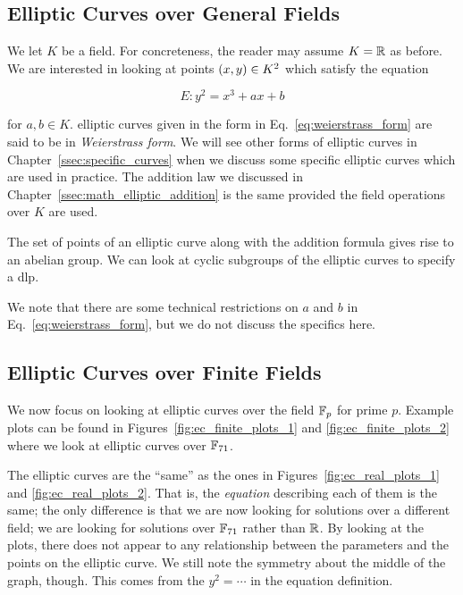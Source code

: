 \subsection{Elliptic Curves over General Fields}

We let $K$ be a \gls{field}.
For concreteness, the reader may assume $K = \mathbb{R}$ as before.
We are interested in looking at points $\left( x,y \right)\in K^{2}$
which satisfy the equation

\begin{equation}
    E: y^{2} = x^{3} + ax + b
    \label{eq:weierstrass_form}
\end{equation}

\noindent
for $a,b\in K$.
\Glspl{elliptic curve} given in the form in Eq.~\eqref{eq:weierstrass_form}
are said to be in \emph{Weierstrass form}.
We will see other forms of \glspl{elliptic curve}
in Chapter~\ref{ssec:specific_curves}
when we discuss some specific \glspl{elliptic curve} which are used in practice.
The addition law we discussed in
Chapter~\ref{ssec:math_elliptic_addition}
is the same provided the field operations over $K$ are used.

The set of points of an \gls{elliptic curve} along with the addition
formula gives rise to an \gls{abelian group}.
We can look at cyclic subgroups of the \glspl{elliptic curve} to specify
a \gls{dlp}.

We note that there are some technical restrictions on $a$ and $b$
in Eq.~\eqref{eq:weierstrass_form},
but we do not discuss the specifics here.


\subsection{Elliptic Curves over Finite Fields}

We now focus on looking at \glspl{elliptic curve} over the
\gls{field} $\mathbb{F}_{p}$ for prime $p$.
Example plots can be found in Figures~\ref{fig:ec_finite_plots_1}
and \ref{fig:ec_finite_plots_2}
where we look at \glspl{elliptic curve} over $\mathbb{F}_{71}$.



The \glspl{elliptic curve} are the ``same'' as the ones in
Figures~\ref{fig:ec_real_plots_1} and \ref{fig:ec_real_plots_2}.
That is, the \emph{equation} describing each of them is the same;
the only difference is that we are now looking for solutions
over a different \gls{field}; we are looking for solutions over $\mathbb{F}_{71}$
rather than $\mathbb{R}$.
By looking at the plots, there does not appear to any relationship
between the parameters and the points on the \gls{elliptic curve}.
We still note the symmetry about the middle of the graph, though.
This comes from the $y^{2} = \cdots$ in the equation definition.

